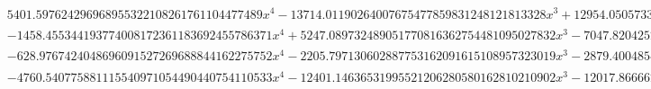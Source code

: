 \documentclass{article}
\begin{document}
\begin{landscape}
\begin{eqnarray*}
\begin{array}{cc}
\begin{array}{cc}
 5401.597624296968955322108261761104477489 x^4-13714.01190264007675477859831248121813328 x^3+12954.05057337760233147529060484252409004 x^2-5394.093843196078189157175886691561006040 x+835.3068429322077246797894960799541904149 & x\geq \frac{1}{2}\land x<\frac{3}{4} \\
 -1458.455344193774008172361183692455786371 x^4+5247.089732489051770816362754481095027832 x^3-7047.820425220217903541647875899333105847 x^2+4188.193029748376527323652223125204273683 x-929.0069928234363864260059180145104092967 & x\geq \frac{3}{4}\land x<1 \\
 -628.9767424048696091527269688844162275752 x^4-2205.797130602887753162091615108957323019 x^3-2879.400485446639133531439693781506429853 x^2-1657.316548704093444187512417773805800951 x-354.7364514554724546654373702168404665415 & x\geq -1\land x<-\frac{3}{4} \\
 -4760.540775881115540971054490440754110533 x^4-12401.14636531995521206280580162810210902 x^3-12017.86666263488080668919805048109719156 x^2-5132.378287392569626972622455698455294618 x-814.5558067326130454623769280871369566480 & x\geq -\frac{3}{4}\land x<-\frac{1}{2}
\end{array}


\end{array}
\end{eqnarray*}
\end{landscape}
\end{document}
